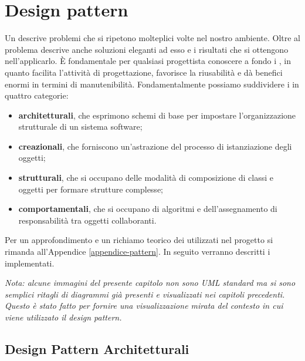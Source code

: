 \section{Design pattern}

Un  descrive problemi che si ripetono molteplici volte nel nostro ambiente. Oltre al problema descrive anche soluzioni eleganti ad esso e i risultati che si ottengono nell'applicarlo. È fondamentale per qualsiasi progettista conoscere a fondo i , in quanto facilita l'attività di progettazione, favorisce la riusabilità e dà benefici enormi in termini di manutenibilità. Fondamentalmente possiamo suddividere i  in quattro categorie:

\begin{itemize}

	\item \textbf{ architetturali}, che esprimono schemi di base per impostare l'organizzazione strutturale di un sistema software;
	\item \textbf{ creazionali}, che forniscono un'astrazione del processo di istanziazione degli oggetti;
	\item \textbf{ strutturali}, che si occupano delle modalità di composizione di classi e oggetti per formare strutture complesse; 
	\item \textbf{ comportamentali}, che si occupano di algoritmi e dell'assegnamento di responsabilità tra oggetti collaboranti.

\end{itemize}

Per un approfondimento e un richiamo teorico dei  utilizzati nel progetto  si rimanda all'Appendice \ref{appendice-pattern}. In seguito verranno descritti i  implementati.

\textit{Nota: alcune immagini del presente capitolo non sono UML standard ma si sono semplici ritagli di diagrammi già presenti e visualizzati nei capitoli precedenti. Questo è stato fatto per fornire una visualizzazione mirata del contesto in cui viene utilizzato il design pattern.}

\subsection{Design Pattern Architetturali}

